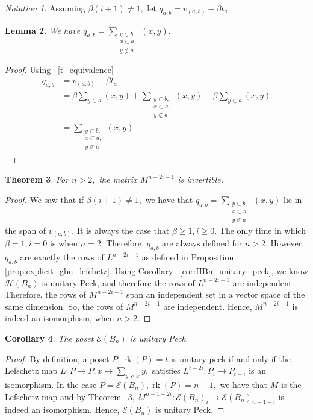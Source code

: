 \documentclass[10 pt]{amsart}
\theoremstyle{plain}
\newtheorem{thm}{Theorem}[section]
\newtheorem{lem}[thm]{Lemma}
\newtheorem{cor}[thm]{Corollary}
\theoremstyle{definition}
\theoremstyle{remark}
\newtheorem{note}[thm]{Notation}
\numberwithin{equation}{section}
\newcommand\rk{\operatorname{rk}}
\begin{document}
\begin{note}
Assuming $\beta(i+1) \neq 1,$ let $q_{a,b} = v_{(a, b)} - \beta t_a.$
\end{note}

\begin{lem}
We have $q_{a,b} = \sum_{\substack{{y\subset b,}\\{x \subset a,}\\{y\not\subset a}}}^{}(x, y).$
\end{lem}
\begin{proof}
Using ~\ref{t_equivalence}
\begin{align*}
	q_{a,b} &= v_{(a, b)} - \beta t_a \\
	&= \beta \sum_{y \subset a}^{}(x, y) + \sum_{\substack{{y\subset b,}\\{x \subset a,}\\{y\not\subset a}}}^{}(x, y) - \beta\sum_{y\subset a}^{}(x, y)\\
	&= \sum_{\substack{{y\subset b,}\\{x \subset a,}\\{y\not\subset a}}}^{}(x, y)
\end{align*}
\end{proof}

\begin{thm}
\label{thm:invertibility_lefschetz}
For $n >2,$ the matrix $M^{n-2i-1}$ is invertible.
\end{thm}
\begin{proof}
We saw that if $\beta(i+1) \neq 1,$ we have that $q_{a,b} = \sum_{\substack{{y\subset b,}\\{x \subset a,}\\{y\not\subset a}}}^{}(x, y)$ lie in the span of $v_{(a, b)}.$ It is always the case that $\beta \geq 1,i \geq 0.$ The only time in which $\beta = 1,i=0$ is when $n = 2.$ Therefore, $q_{a,b}$ are always defined for $n > 2.$ However, $q_{a,b}$ are exactly the rows of $L^{n-2i-1}$ as defined in Proposition \ref{prop:explicit_gbn_lefchetz}. Using Corollary ~\ref{cor:HBn_unitary_peck}, we know $\mathcal H(B_n)$ is unitary Peck, and therefore the rows of $L^{n-2i-1}$ are independent. Therefore, the rows of $M^{n-2i-1}$ span an independent set in a vector space of the same dimension. So, the rows of $M^{n-2i-1}$ are independent. Hence, $M^{n-2i-1}$ is indeed an isomorphism, when $n > 2.$
\end{proof}

\begin{cor}
\label{cor:unitary_peck_edge_bn}
The poset $\mathcal E(B_n)$ is unitary Peck.
\end{cor}
\begin{proof}
By definition, a poset $P,\rk(P) = t$  is unitary peck if and only if the Lefschetz map $L:P \rightarrow P,x \mapsto \sum_{y \gtrdot x} y,$ satisfies $L^{t-2i}:P_i \rightarrow P_{t-i}$ is an isomorphism. In the case $P = \mathcal E(B_n),\rk(P) = n-1,$ we have that $M$ is the Lefschetz map and by Theorem ~\ref{thm:invertibility_lefschetz}, $M^{n-1-2i}:\mathcal E(B_n)_i \rightarrow \mathcal E(B_n)_{n-1-i}$ is indeed an isomorphism. Hence, $\mathcal E(B_n)$ is unitary Peck.
\end{proof}
\end{document}
